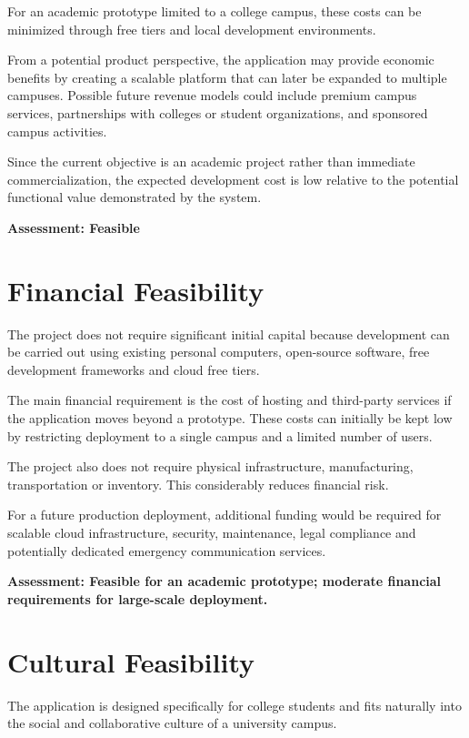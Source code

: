 \documentclass{tietreport}
\begin{document}
For an academic prototype limited to a college campus, these costs can be minimized
through free tiers and local development environments.

From a potential product perspective, the application may provide economic benefits by
creating a scalable platform that can later be expanded to multiple campuses. Possible
future revenue models could include premium campus services, partnerships with colleges
or student organizations, and sponsored campus activities.

Since the current objective is an academic project rather than immediate
commercialization, the expected development cost is low relative to the potential
functional value demonstrated by the system.

\noindent\textbf{Assessment: Feasible}

\section{Financial Feasibility}

The project does not require significant initial capital because development can be
carried out using existing personal computers, open-source software, free development
frameworks and cloud free tiers.

The main financial requirement is the cost of hosting and third-party services if the
application moves beyond a prototype. These costs can initially be kept low by
restricting deployment to a single campus and a limited number of users.

The project also does not require physical infrastructure, manufacturing, transportation
or inventory. This considerably reduces financial risk.

For a future production deployment, additional funding would be required for scalable
cloud infrastructure, security, maintenance, legal compliance and potentially dedicated
emergency communication services.

\noindent\textbf{Assessment: Feasible for an academic prototype; moderate financial
requirements for large-scale deployment.}

\section{Cultural Feasibility}

The application is designed specifically for college students and fits naturally into the
social and collaborative culture of a university campus.
\end{document}
